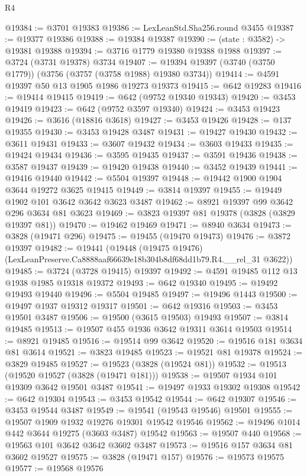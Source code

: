 \begin{lexlean}{R4}
\begin{coremodule}
@19384 := @3701 @19383
@19386 := LexLeanStd.Sha256.round @3455
@19387 := @19377 @19386
@19388 := @19384 @19387
@19390 := (state : @3582) -> @19381 @19388
@19394 := @3716 @1779 @19380 @19388 @1988
@19397 := @3724 (@3731 @19378) @3734
@19407 := @19394 @19397 (@3740 (@3750 @1779)) (@3756 (@3757 (@3758 @1988) @19380 @3734))
@19414 := @4591 @19397 @50 @13 @1905 @1986 @19273 @19373
@19415 := @642 @19283
@19416 := @19414 @19415
@19419 := @642 (@9752 @19340 @19343)
@19420 := @3453 @19419
@19423 := @642 (@9752 @3597 @19340)
@19424 := @3453 @19423
@19426 := @3616 (@18816 @3618)
@19427 := @3453 @19426
@19428 := @137 @19355
@19430 := @3453 @19428 @3487
@19431 := @19427 @19430
@19432 := @3611 @19431
@19433 := @3607 @19432
@19434 := @3603 @19433
@19435 := @19424 @19434
@19436 := @3595 @19435
@19437 := @3591 @19436
@19438 := @3587 @19437
@19439 := @19420 @19438
@19440 := @3452 @19439
@19441 := @19416 @19440
@19442 := @5504 @19397
@19448 := @19442 @1900 @1904 @3644 @19272 @3625 @19415
@19449 := @3814 @19397
@19455 := @19449 @1902 @101 @3642 @3642 @3623 @3487
@19462 := @8921 @19397 @99 @3642 @296 @3634 @81 @3623
@19469 := @3823 @19397 @81 @19378 (@3828 (@3829 @19397 @81))
@19470 := @19462 @19469
@19471 := @8940 @3634
@19473 := @3828 (@19471 @296)
@19475 := @19455 (@19470 @19473)
@19476 := @3872 @19397
@19482 := @19441
    (@19448 (@19475 @19476) (LexLeanPreserve.Ca8888aaf66639e18b304b8df68dd1b79.R4.__rel_31 @3622))
@19485 := @3724 (@3728 @19415) @19397
@19492 := @4591 @19485 @112 @13 @1938 @1985 @19318 @19372
@19493 := @642 @19340
@19495 := @19492 @19493 @19440
@19496 := @5504 @19485
@19497 := @19496 @1443
@19500 := @19497 @1937 @19312 @19317
@19501 := @642 @19316
@19503 := @3453 @19501 @3487
@19506 := @19500 (@3615 @19503) @19493
@19507 := @3814 @19485
@19513 := @19507 @455 @1936 @3642 @19311 @3614 @19503
@19514 := @8921 @19485
@19516 := @19514 @99 @3642
@19520 := @19516 @181 @3634 @81 @3614
@19521 := @3823 @19485
@19523 := @19521 @81 @19378
@19524 := @3829 @19485
@19527 := @19523 (@3828 (@19524 @81))
@19532 := @19513 (@19520 @19527 (@3828 (@19471 @181)))
@19538 := @19507 @1934 @101 @19309 @3642 @19501 @3487
@19541 := @19497 @1933 @19302 @19308
@19542 := @642 @19304
@19543 := @3453 @19542
@19544 := @642 @19307
@19546 := @3453 @19544 @3487
@19549 := @19541 (@19543 @19546) @19501
@19555 := @19507 @1909 @1932 @19276 @19301 @19542 @19546
@19562 := @19496 @1014 @442 @3644 @19275 (@3603 @3487) @19542
@19563 := @19507 @440
@19568 := @19563 @101 @3642 @3642 @3602 @3487
@19573 := @19516 @157 @3634 @81 @3602 @19527
@19575 := @3828 (@19471 @157)
@19576 := @19573 @19575
@19577 := @19568 @19576

\end{coremodule}
\end{lexlean}
